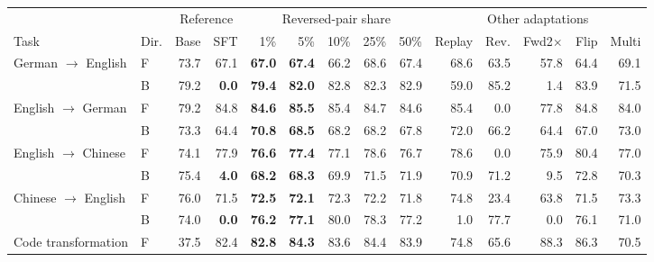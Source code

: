 \begin{table}[t]
\centering\footnotesize
\setlength{\tabcolsep}{3pt}
\begin{tabular}{llrrrrrrrrrrrr}
\toprule
 & & \multicolumn{2}{c}{Reference} & \multicolumn{5}{c}{Reversed-pair share} & \multicolumn{5}{c}{Other adaptations} \\
\cmidrule(lr){3-4}\cmidrule(lr){5-9}\cmidrule(lr){10-14}
Task & Dir. & Base & SFT & 1\% & 5\% & 10\% & 25\% & 50\% & Replay & Rev. & Fwd2$\times$ & Flip & Multi \\
\midrule
German $\to$ English & F & 73.7 & 67.1 & \textcolor{blue!60!black}{\textbf{67.0}} & \textcolor{blue!60!black}{\textbf{67.4}} & 66.2 & 68.6 & 67.4 & 68.6 & 63.5 & 57.8 & 64.4 & 69.1 \\
 & B & 79.2 & \textcolor{red!70!black}{\textbf{0.0}} & \textcolor{blue!60!black}{\textbf{79.4}} & \textcolor{blue!60!black}{\textbf{82.0}} & 82.8 & 82.3 & 82.9 & 59.0 & 85.2 & 1.4 & 83.9 & 71.5 \\
\addlinespace[2pt]
English $\to$ German & F & 79.2 & 84.8 & \textcolor{blue!60!black}{\textbf{84.6}} & \textcolor{blue!60!black}{\textbf{85.5}} & 85.4 & 84.7 & 84.6 & 85.4 & 0.0 & 77.8 & 84.8 & 84.0 \\
 & B & 73.3 & 64.4 & \textcolor{blue!60!black}{\textbf{70.8}} & \textcolor{blue!60!black}{\textbf{68.5}} & 68.2 & 68.2 & 67.8 & 72.0 & 66.2 & 64.4 & 67.0 & 73.0 \\
\addlinespace[2pt]
English $\to$ Chinese & F & 74.1 & 77.9 & \textcolor{blue!60!black}{\textbf{76.6}} & \textcolor{blue!60!black}{\textbf{77.4}} & 77.1 & 78.6 & 76.7 & 78.6 & 0.0 & 75.9 & 80.4 & 77.0 \\
 & B & 75.4 & \textcolor{red!70!black}{\textbf{4.0}} & \textcolor{blue!60!black}{\textbf{68.2}} & \textcolor{blue!60!black}{\textbf{68.3}} & 69.9 & 71.5 & 71.9 & 70.9 & 71.2 & 9.5 & 72.8 & 70.3 \\
\addlinespace[2pt]
Chinese $\to$ English & F & 76.0 & 71.5 & \textcolor{blue!60!black}{\textbf{72.5}} & \textcolor{blue!60!black}{\textbf{72.1}} & 72.3 & 72.2 & 71.8 & 74.8 & 23.4 & 63.8 & 71.5 & 73.3 \\
 & B & 74.0 & \textcolor{red!70!black}{\textbf{0.0}} & \textcolor{blue!60!black}{\textbf{76.2}} & \textcolor{blue!60!black}{\textbf{77.1}} & 80.0 & 78.3 & 77.2 & 1.0 & 77.7 & 0.0 & 76.1 & 71.0 \\
\addlinespace[2pt]
Code transformation & F & 37.5 & 82.4 & \textcolor{blue!60!black}{\textbf{82.8}} & \textcolor{blue!60!black}{\textbf{84.3}} & 83.6 & 84.4 & 83.9 & 74.8 & 65.6 & 88.3 & 86.3 & 70.5 \\

\end{tabular}
\end{table}
